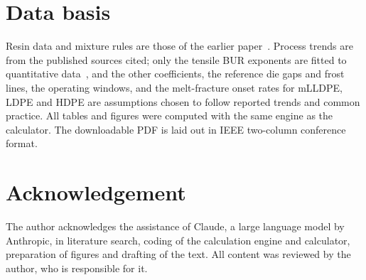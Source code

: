 \documentclass[conference,a4paper]{IEEEtran}
\begin{document}
\section*{Data basis}

Resin data and mixture rules are those of the earlier paper~\cite{r1}. Process trends are from the published sources cited; only the tensile BUR exponents are fitted to quantitative data~\cite{r2}, and the other coefficients, the reference die gaps and frost lines, the operating windows, and the melt-fracture onset rates for mLLDPE, LDPE and HDPE are assumptions chosen to follow reported trends and common practice. All tables and figures were computed with the same engine as the calculator. The downloadable PDF is laid out in IEEE two-column conference format.

\section*{Acknowledgement}

The author acknowledges the assistance of Claude, a large language model by Anthropic, in literature search, coding of the calculation engine and calculator, preparation of figures and drafting of the text. All content was reviewed by the author, who is responsible for it.
\end{document}
